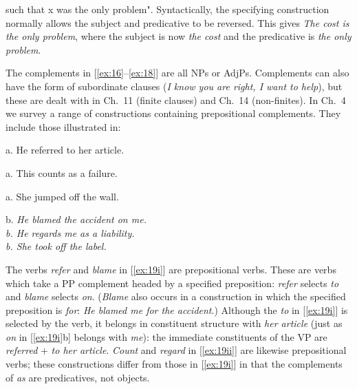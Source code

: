 \newpage\normalsize 

\noindent such that x was the only problem". Syntactically, the specifying construction normally allows the subject and predicative to be reversed. This gives \textit{The cost is the only problem}, where the subject is now \textit{the cost} and the predicative is \textit{the only problem}.

The complements in [\ref{ex:16}--\ref{ex:18}] are all NPs or AdjPs. Complements can also have the form of subordinate clauses (\textit{I know you are right, I want to help}), but these are dealt with in Ch.~11 (finite clauses) and Ch.~14 (non-finites). In Ch.~4 we survey a range of constructions containing prepositional complements. They include those illustrated in:

\begin{examples}
\item \label{ex:19}
\noindent
\begin{minipage}[t]{0.5\linewidth}\vspace{-6pt}
    \begin{examples}[nosep]
        \item \label{ex:19i} \textnormal{a.} He referred to her article.
        \item \label{ex:19ii} \textnormal{a.} This counts as a failure.
        \item \label{ex:19iii} \textnormal{a.} She jumped off the wall.
    \end{examples}
\end{minipage}
\begin{minipage}[t]{0.5\linewidth}
    b. \itshape He blamed the accident on me.\\
    \textnormal{b.} He regards me as a liability.\\
    \textnormal{b.} She took off the label.
\end{minipage}\vspace{-6pt}
\end{examples}
The verbs \textit{refer} and \textit{blame} in [\ref{ex:19i}] are {prepositional verbs}. These are verbs which take a PP complement headed by a specified preposition: \textit{refer} selects \textit{to} and \textit{blame} selects \textit{on}. (\textit{Blame} also occurs in a construction in which the specified preposition is \textit{for}: \textit{He blamed me for the accident}.) Although the \textit{to} in [\ref{ex:19i}] is selected by the verb, it belongs in constituent structure with \textit{her article} (just as \textit{on} in [\ref{ex:19i}b] belongs with \textit{me}): the immediate constituents of the VP are \textit{referred} + \textit{to her article}. \textit{Count} and \textit{regard} in [\ref{ex:19ii}] are likewise prepositional verbs; these constructions differ from those in [\ref{ex:19i}] in that the complements of \textit{as} are predicatives, not objects. 

